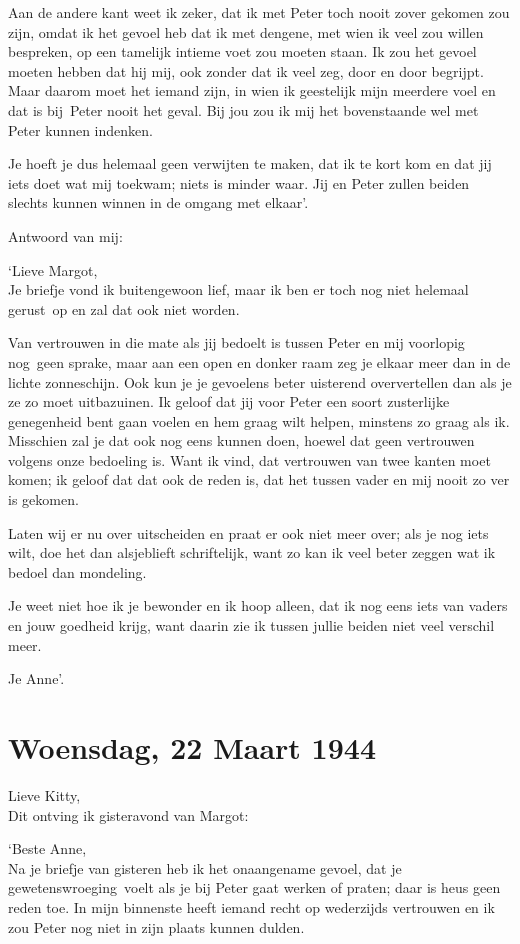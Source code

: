 \documentclass{book}
\begin{document}
Aan de andere kant weet ik zeker, dat ik met Peter toch nooit zover
gekomen zou zijn, omdat ik het gevoel heb dat ik met dengene, met wien
ik veel zou willen bespreken, op een tamelijk intieme voet zou moeten
staan. Ik zou het gevoel moeten hebben dat hij mij, ook zonder dat ik
veel zeg, door en door begrijpt. Maar daarom moet het iemand zijn, in
wien ik geestelijk mijn meerdere voel en dat is bij~Peter nooit het
geval. Bij jou zou ik mij het bovenstaande wel met Peter kunnen
indenken.

Je hoeft je dus helemaal geen verwijten te maken, dat ik te kort kom en
dat jij iets doet wat mij toekwam; niets is minder waar. Jij en Peter
zullen beiden slechts kunnen winnen in de omgang met elkaar'.

Antwoord van mij:

`Lieve Margot,\\Je briefje vond ik buitengewoon lief, maar ik ben er
toch nog niet helemaal gerust~op en zal dat ook niet worden.

Van vertrouwen in die mate als jij bedoelt is tussen Peter en mij
voorlopig nog~geen sprake, maar aan een open en donker raam zeg je
elkaar meer dan in de lichte zonneschijn. Ook kun je je gevoelens beter
uisterend oververtellen dan als je ze zo moet uitbazuinen. Ik geloof dat
jij voor Peter een soort zusterlijke genegenheid bent gaan voelen en hem
graag wilt helpen, minstens zo graag als ik. Misschien zal je dat ook
nog eens kunnen doen, hoewel dat geen vertrouwen volgens onze bedoeling
is. Want ik vind, dat vertrouwen van twee kanten moet komen; ik geloof
dat dat ook de reden is, dat het tussen vader en mij nooit zo ver is
gekomen.

Laten wij er nu over uitscheiden en praat er ook niet meer over; als je
nog iets wilt, doe het dan alsjeblieft schriftelijk, want zo kan ik veel
beter zeggen wat ik bedoel dan mondeling.

Je weet niet hoe ik je bewonder en ik hoop alleen, dat ik nog eens iets
van vaders en jouw goedheid krijg, want daarin zie ik tussen jullie
beiden niet veel verschil meer.

Je Anne'.

\chapter{Woensdag, 22 Maart 1944}

Lieve Kitty,\\Dit ontving ik gisteravond van Margot:

`Beste Anne,\\Na je briefje van gisteren heb ik het onaangename gevoel,
dat je gewetenswroeging~voelt als je bij Peter gaat werken of praten;
daar is heus geen reden toe. In mijn binnenste heeft iemand recht op
wederzijds vertrouwen en ik zou Peter nog niet in zijn plaats kunnen
dulden.
\end{document}
